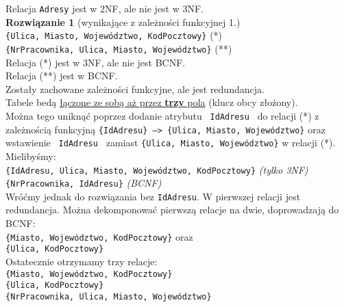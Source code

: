 Relacja \texttt{Adresy} jest w 2NF, ale nie jest w 3NF.\\

\textbf{Rozwiązanie 1} (wynikające z zależności funkcyjnej 1.)\\

\texttt{\{{\color{green}\faKey}{\color{blue}\faKey}Ulica,
{\color{green}\faKey}Miasto, {\color{green}\faKey}Województwo,
{\color{blue}\faKey}KodPocztowy\}} (*)\\
\texttt{\{{\color{green}\faKey}NrPracownika, Ulica, Miasto, Województwo\}}
(**)\\

Relacja (*) jest w 3NF, ale nie jest BCNF.\\
Relacja (**) jest w BCNF.\\

Zostały zachowane zależności funkcyjne, ale jest redundancja.\\
Tabele bedą \underline{łączone ze sobą aż przez \textbf{trzy} pola}
(klucz obcy złożony).\\
Można tego uniknąć poprzez dodanie atrybutu \texttt{ IdAdresu } do
relacji (*) z zależnością funkcyjną \texttt{\{IdAdresu\} --> \{Ulica,
Miasto, Województwo\}} oraz wstawienie \texttt{ IdAdresu } zamiast
\texttt{\{Ulica, Miasto, Województwo\}} w relacji (*). Mielibyśmy:\\

\texttt{\{{\color{red}\faKey}IdAdresu,
{\color{green}\faKey}{\color{blue}\faKey}Ulica,
{\color{green}\faKey}Miasto, {\color{green}\faKey}Województwo,
{\color{green}\faKey}KodPocztowy\}}
\textit{(tylko 3NF)}\\
\texttt{\{{\color{green}\faKey}NrPracownika, IdAdresu\}} \textit{(BCNF)}\\

Wróćmy jednak do rozwiązania bez \texttt{IdAdresu}. W pierwszej relacji jest
redundancja. Można dekomponować pierwszą relacje na dwie, doprowadzają do
BCNF:\\
\texttt{\{Miasto, Województwo, {\color{blue}\faKey}KodPocztowy\}} oraz\\
\texttt{\{{\color{green}\faKey}Ulica, {\color{green}\faKey}KodPocztowy\}}\\

Ostatecznie otrzymamy trzy relacje:\\
\texttt{\{Miasto, Województwo, {\color{blue}\faKey}KodPocztowy\}}\\
\texttt{\{{\color{green}\faKey}Ulica, {\color{green}\faKey}KodPocztowy\}}\\
\texttt{\{{\color{green}\faKey}NrPracownika, Ulica, Miasto, Województwo\}}\\


